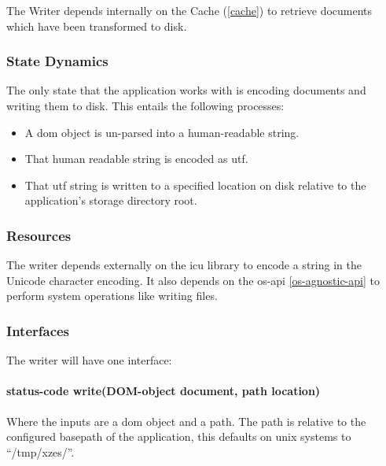 The Writer depends internally on the Cache (\ref{cache}) to retrieve documents which have been transformed to disk.

\subsubsection{State Dynamics}

The only state that the application works with is encoding documents and writing them to disk.
This entails the following processes:

\begin{itemize}
	\item A \gls{dom} object is un-parsed into a human-readable string.
    \item That human readable string is encoded as \gls{utf}.
    \item That \gls{utf} string is written to a specified location on disk relative to the application's storage directory root.
\end{itemize}

\subsubsection{Resources}

The writer depends externally on the \gls{icu} library to encode a string in the Unicode character encoding. \cite{icu-library}
It also depends on the \gls{os-api} \ref{os-agnostic-api} to perform system operations like writing files.

\subsubsection{Interfaces}

The writer will have one interface: 

\paragraph{status-code write(DOM-object document, path location)}

Where the inputs are a \gls{dom} object and a path.
The path is relative to the configured basepath of the application, this defaults on \gls{unix} systems to ``/tmp/xzes/''.

